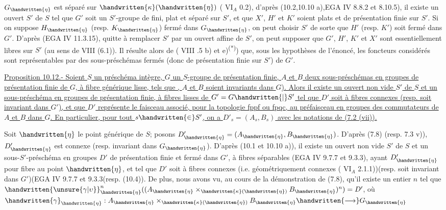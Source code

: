 $G_{\handwritten{\eta}}$ est séparé sur $\handwritten{\kappa}(\handwritten{\eta})$ ( $\mathrm{VI}_A$ 0.2), d'après (10.2,10.10 a),EGA IV 8.8.2 et 8.10.5), il existe un ouvert $S'$ de $S$ tel que $G'$ soit un $S'$-groupe de  fini, plat et séparé sur $S'$, et que $X'$, $H'$ et $K'$ soient plats et de présentation finie sur $S'$. Si on suppose $H_{\handwritten{\eta}}$ (resp. $K_{\handwritten{\eta}}$) fermé dans $G_{\handwritten{\eta}}$, on peut choisir $S'$ de sorte que $H'$ (resp. $K'$) soit fermé dans $G'$. D'après (EGA IV 11.3.15), quitte à remplacer $S'$ par un ouvert affine de $S'$, on peut supposer que $G'$, $H'$, $K'$ et $X'$ sont essentiellement libres sur $S'$ (au sens de  VIII (6.1)). Il résulte alors de ( VIII .5 b) et e)\textsuperscript{(*)}) que, sous les hypothèses de l'énoncé, les foncteurs considérés sont représentables par des sous-préschémas fermés (donc de présentation finie sur $S'$) de $G'$.

\uline{Proposition 10.12.- Soient $S$ un préschéma intègre, $G$ un  $S$-groupe de présentation finie, $A$ et $B$ deux sous-préschémas en groupes de présentation finie de $G$, à fibre générique lisse, tels que ,  $A$ et $B$ soient invariants dans $G$). Alors il existe un ouvert non vide $S'$ de $S$ et un sous-préschéma en groupes de présentation finie, à fibres lisses  de $G'=G\handwritten{|}S'$\handwritten{,} tel que $D'$ soit  à fibres connexes (resp. soit invariant dans $G'$), et que $D'$ représente le faisceau associé, pour la topologie fppf ou fpqc, au préfaisceau en groupes des commutateurs de $A$ et $B$ dans $G$. En particulier, pour tout $s\handwritten{\in}S'$, on a $D'_s=(A_s,B_s)$ avec les notations de (7.2 (vii)).}

Soit $\handwritten{\eta}$ le point générique de $S$; posons $D'_{\handwritten{\eta}}=(A_{\handwritten{\eta}},B_{\handwritten{\eta}})$. D'après (7.8) (resp. 7.3 v)), $D'_{\handwritten{\eta}}$ est connexe (resp. invariant dans $G_{\handwritten{\eta}}$). D'après (10.1 et 10.10 a)), il existe un ouvert non vide $S'$ de $S$ et un sous-$S'$-préschéma en groupes $D'$ de présentation finie et fermé dans $G'$, à fibres séparables (EGA IV 9.7.7 et 9.3.3), ayant $D'_{\handwritten{\eta}}$ pour fibre au point $\handwritten{\eta}$, et tel que $D'$ soit à fibres connexes (i.e. géométriquement connexes ( $\mathrm{VI}_A$ 2.1.1))(resp. soit invariant dans $G'$)(EGA IV 9.7.7 et 9.3.3\inserted{\handwritten{)}}(resp. (10.4)). De plus, nous avons vu, au cours de la démonstration de (7.8), qu'il existe un entier $n$ tel que $\handwritten{\unsure{\gamma|\upsilon}}_{\handwritten{\eta}}^n((A_{\handwritten{\eta}}\times_{\handwritten{\kappa}(\handwritten{\eta})}B_{\handwritten{\eta}})^n)=D'$, où $\handwritten{\gamma}_{\handwritten{\eta}}:A_{\handwritten{\eta}}\times_{\handwritten{\kappa}(\handwritten{\eta})}B_{\handwritten{\eta}}\handwritten{\longrightarrow}G_{\handwritten{\eta}}$

\par\noindent\handwritten{\rule{\linewidth}{0.3pt}}\par
{}\par
